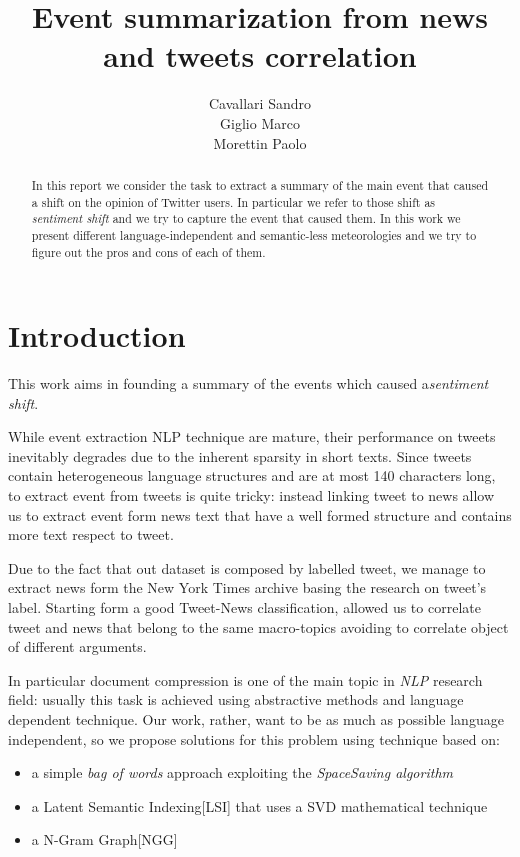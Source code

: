 \documentclass{acm_proc_article-sp-sigmod07}
\begin{document}
\title{Event summarization from news and tweets correlation}
\author{Cavallari Sandro\\Giglio Marco\\Morettin Paolo}

%
\maketitle
\begin{abstract}
In this report we consider the task to extract a summary of the main event that caused a shift on the opinion of Twitter users. In particular we refer to those shift as \emph{sentiment shift} and we try to capture the event that caused them. In this work we present different language-independent and semantic-less meteorologies and we try to figure out the pros and cons of each of them.
\end{abstract}  

\section*{Introduction}
This work aims in founding a summary of the events which caused a\emph{sentiment shift}. 

While event extraction NLP technique are mature, their performance on tweets inevitably degrades due to the inherent sparsity in short texts.  Since tweets contain heterogeneous language structures and are at most 140 characters long, to extract event from tweets is quite tricky: instead linking tweet to news allow us to extract event form news text that have a well formed structure and contains more text respect to tweet.

Due to the fact that out dataset is composed by labelled tweet, we manage to extract news form the New York Times archive basing the research on tweet's label. Starting form a good Tweet-News classification, allowed us to correlate tweet and news that belong to the same macro-topics avoiding to correlate object of different arguments.

In particular document compression is one of the main topic in \emph{NLP} research field: usually this task is achieved using abstractive methods and language dependent technique.  Our work, rather, want to be as much as possible language independent, so we propose solutions for this problem using technique based on:
\begin{itemize}
	\item a simple \emph{bag of words} approach exploiting the \emph{SpaceSaving algorithm} \cite{SS}
	\item a Latent Semantic Indexing[LSI] that uses a SVD mathematical technique \cite{LSA}
	\item a N-Gram Graph[NGG] \cite{Ngram}
\end{itemize}
\end{document}
